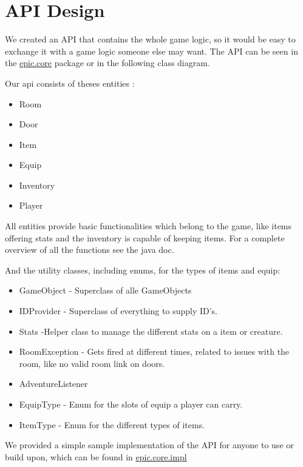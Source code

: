 \chapter{API Design}

We created an API that contains the whole game logic, so it would be easy to exchange it with a game logic someone else may want. The API can be seen in the \href{https://github.com/kerko/epic/tree/master/project/src/nl/fontys/epic/core}{epic.core} package or in the following class diagram. 

Our api consists of theses entities : 
\begin{itemize}
\item Room
\item Door
\item Item
\item Equip
\item Inventory
\item Player
\end{itemize}
All entities provide basic functionalities which belong to the game, like items offering stats and the inventory is capable of keeping items. For a complete overview of all the functions see the java doc.

And the utility classes, including enums, for the types of items and equip:
\begin{itemize}
\item GameObject - Superclass of alle GameObjects 
\item IDProvider - Superclass of everything to supply ID's.
\item Stats -Helper class to manage the different stats on a item or creature.
\item RoomException - Gets fired at different times, related to issues with the room, like no valid room link on doors.
\item AdventureListener
\item EquipType - Enum for the slots of equip a player can carry.
\item ItemType -  Enum for the different types of items.
\end{itemize}


We provided a simple sample implementation of the API for anyone to use or build upon, which can be found in \href{https://github.com/kerko/epic/tree/master/project/src/nl/fontys/epic/core/impl}{epic.core.impl}


